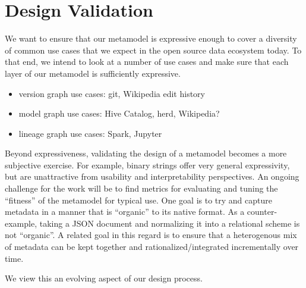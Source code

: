 \documentclass{article}
\newcommand{\versiongraph}{version graph\xspace}
\newcommand{\modelgraph}{model graph\xspace}
\newcommand{\lineagegraph}{lineage graph\xspace}
\begin{document}
\section{Design Validation}
We want to ensure that our metamodel is expressive enough to cover a diversity of common use cases that we expect in the open source data ecosystem today.  
To that end, we intend to look at a number of use cases and make sure that each layer of our metamodel is sufficiently expressive. 


\begin{itemize}
\item \versiongraph use cases: git, Wikipedia edit history

\item \modelgraph use cases: Hive Catalog, herd, Wikipedia?

\item \lineagegraph use cases: Spark, Jupyter
\end{itemize}

Beyond expressiveness, validating the design of a metamodel becomes a more subjective exercise.  For example, binary strings offer very general expressivity, but are unattractive from usability and interpretability perspectives.  An ongoing challenge for the work will be to find metrics for evaluating and tuning the ``fitness'' of the metamodel for typical use.  One goal is to try and capture metadata in a manner that is ``organic'' to its native format.  As a counter-example, taking a JSON document and normalizing it into a relational scheme is not ``organic''. A related goal in this regard is to ensure that a heterogenous mix of metadata can be kept together and rationalized/integrated incrementally over time.

We view this an evolving aspect of our design process.
\end{document}
